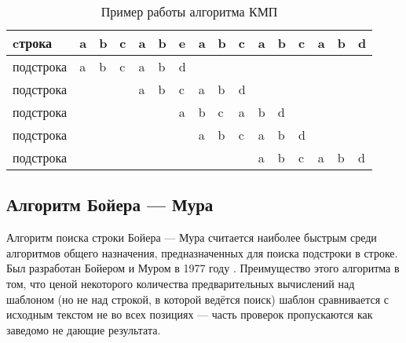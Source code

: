 \begin{table}[!h]
	\begin{center}
		\begin{tabular}{|l|l|l|l|l|l|l|l|l|l|l|l|l|l|l|l|}
			\hline
			cтрока    & a & b & c & a & b & e                         & a & b & c & a                         & b                         & c                         & a                         & b                         & d                         \\ \hline
			подстрока & a & b & c & a & b & \cellcolor[HTML]{FE0000}d &   &   &   &                           &                           &                           &                           &                           &                           \\ \hline
			подстрока &   &   &   & a & b & \cellcolor[HTML]{FE0000}c & a & b & d &                           &                           &                           &                           &                           &                           \\ \hline
			подстрока &   &   &   &   &   & \cellcolor[HTML]{FE0000}a & b & c & a & b                         & d                         &                           &                           &                           &                           \\ \hline
			подстрока &   &   &   &   &   &                           & a & b & c & a                         & b                         & \cellcolor[HTML]{FE0000}d &                           &                           &                           \\ \hline
			подстрока &   &   &   &   &   &                           &   &   &   & \cellcolor[HTML]{34FF34}a & \cellcolor[HTML]{34FF34}b & \cellcolor[HTML]{34FF34}c & \cellcolor[HTML]{34FF34}a & \cellcolor[HTML]{34FF34}b & \cellcolor[HTML]{34FF34}d \\ \hline
		\end{tabular}
		\caption{Пример работы алгоритма КМП}
		\label{tbl:kmp-example-analysis}
	\end{center}
\end{table}

\subsection{Алгоритм Бойера — Мура}

Алгоритм поиска строки Бойера — Мура считается наиболее быстрым среди алгоритмов общего назначения, предназначенных для поиска подстроки в строке.
Был разработан Бойером и Муром в 1977 году \cite{Boyer}.
Преимущество этого алгоритма в том, что ценой некоторого количества предварительных вычислений над шаблоном (но не над строкой, в которой ведётся поиск) шаблон сравнивается с исходным текстом не во всех позициях — часть проверок пропускаются как заведомо не дающие результата.

